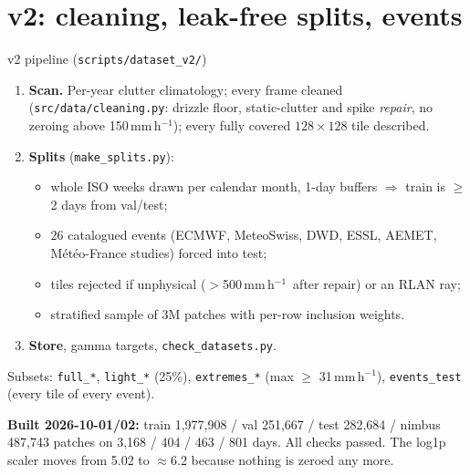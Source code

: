 \documentclass[aspectratio=169,10pt]{beamer}
\newcommand{\mmh}{\,mm\,h$^{-1}$}
\newcommand{\code}[1]{\texttt{\small #1}}
\begin{document}
\section{v2: cleaning, leak-free splits, events}

\begin{frame}{v2 pipeline (\code{scripts/dataset\_v2/})}
  \small
  \begin{enumerate}
    \item \textbf{Scan.} Per-year clutter climatology; every frame cleaned
      (\code{src/data/cleaning.py}: drizzle floor, static-clutter and spike \emph{repair},
      no zeroing above 150\mmh); every fully covered $128\times128$ tile described.
    \item \textbf{Splits} (\code{make\_splits.py}):
      \begin{itemize}
        \item whole ISO weeks drawn per calendar month, 1-day buffers $\Rightarrow$ train is
          $\ge$ 2 days from val/test;
        \item 26 catalogued events (ECMWF, MeteoSwiss, DWD, ESSL, AEMET, Météo-France
          studies) forced into test;
        \item tiles rejected if unphysical ($>$500\mmh\ after repair) or an RLAN ray;
        \item stratified sample of 3M patches with per-row inclusion weights.
      \end{itemize}
    \item \textbf{Store}, gamma targets, \code{check\_datasets.py}.
  \end{enumerate}
  \vspace{1mm}
  Subsets: \code{full\_*}, \code{light\_*} (25\%), \code{extremes\_*} (max $\ge$ 31\mmh),
  \code{events\_test} (every tile of every event).
  \vspace{1mm}

  \textbf{Built 2026-10-01/02:} train 1,977,908 / val 251,667 / test 282,684 / nimbus 487,743
  patches on 3,168 / 404 / 463 / 801 days. All checks passed. The log1p scaler moves from 5.02
  to $\approx$6.2 because nothing is zeroed any more.
\end{frame}
\end{document}
